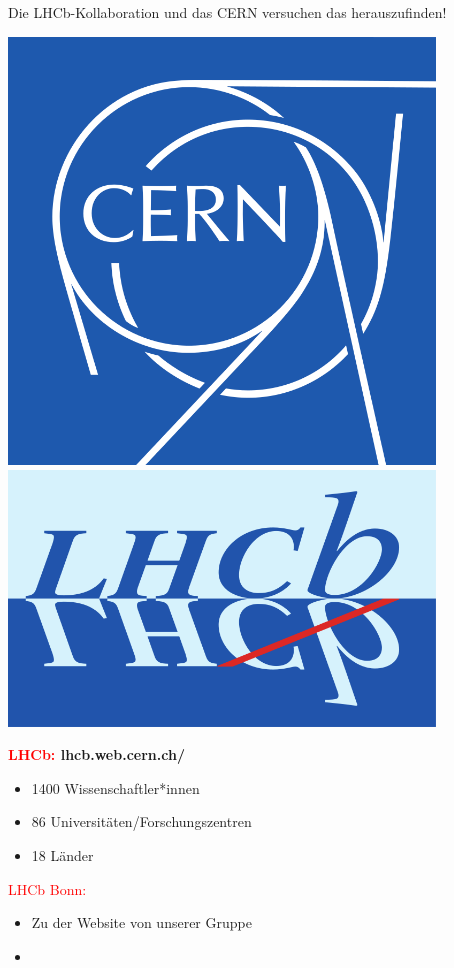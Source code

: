 \begin{frame}{Die LHCb-Kollaboration und das CERN versuchen das herauszufinden!}
\begin{minipage}{0.21\textwidth} \begin{center}
\includegraphics[width=0.85\textwidth]{Logos And Group/CERN_logo.png} \\ \vspace{.75cm}
\includegraphics[width=0.85\textwidth]{Logos And Group/LHCb_Logo.png} \\ \vspace{.75cm}
\LogoInsitute
\end{center}\end{minipage}\begin{minipage}{0.82\textwidth}
\textbf{\textcolor{red}{LHCb:} lhcb.web.cern.ch/}
\begin{itemize}
\item 1400 Wissenschaftler*innen
\item 86 Universitäten/Forschungszentren
\item 18 Länder
\vspace{0.5cm}
\end{itemize}\textcolor{red}{LHCb Bonn:}\begin{itemize}
    
\item Zu der Website von unserer Gruppe
\item[] \textbf{\WorkGroupWebsite}
\end{itemize}
\end{minipage}

\end{frame}
